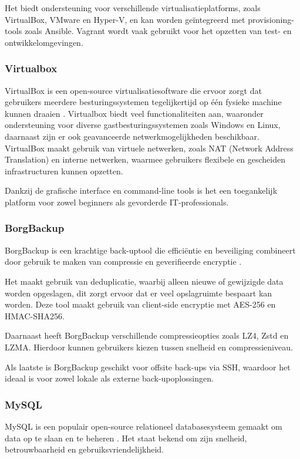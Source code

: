 Het biedt ondersteuning voor verschillende virtualisatieplatforms, zoals VirtualBox, VMware en Hyper-V, en kan worden geïntegreerd met provisioning-tools zoals Ansible. Vagrant wordt vaak gebruikt voor het opzetten van test- en ontwikkelomgevingen.

\subsubsection{Virtualbox}
VirtualBox is een open-source virtualisatiesoftware die ervoor zorgt dat gebruikers meerdere besturingssystemen tegelijkertijd op één fysieke machine kunnen draaien \autocite{Oracle}. Virtualbox biedt veel functionaliteiten aan, waaronder ondersteuning voor diverse gastbesturingssystemen zoals Windows en Linux, daarnaast zijn er ook geavanceerde netwerkmogelijkheden beschikbaar. VirtualBox maakt gebruik van virtuele netwerken, zoals NAT (Network Address Translation) en interne netwerken, waarmee gebruikers flexibele en gescheiden infrastructuren kunnen opzetten. 

Dankzij de grafische interface en command-line tools is het een toegankelijk platform voor zowel beginners als gevorderde IT-professionals. 

\subsubsection{BorgBackup}
BorgBackup is een krachtige back-uptool die efficiëntie en beveiliging combineert door gebruik te maken van compressie en geverifieerde encryptie \autocite{BorgBackup2024}.   

Het maakt gebruik van deduplicatie, waarbij alleen nieuwe of gewijzigde data worden opgeslagen, dit zorgt ervoor dat er veel opslagruimte bespaart kan worden. Deze tool maakt gebruik van client-side encryptie met AES-256 en HMAC-SHA256. 

Daarnaast heeft BorgBackup verschillende compressieopties zoals LZ4, Zstd en LZMA. Hierdoor kunnen gebruikers kiezen tussen snelheid en compressieniveau. 

Als laatste is BorgBackup geschikt voor offsite back-ups via SSH, waardoor het ideaal is voor zowel lokale als externe back-upoplossingen.


\subsubsection{MySQL}
MySQL is een populair open-source relationeel databasesysteem gemaakt om data op te slaan en te beheren \autocite{Erickson2024}. Het staat bekend om zijn snelheid, betrouwbaarheid en gebruiksvriendelijkheid. 

